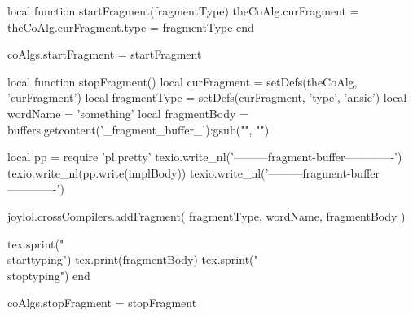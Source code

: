 \startLuaCode
local function startFragment(fragmentType)
  theCoAlg.curFragment      = { }
  theCoAlg.curFragment.type = fragmentType
end

coAlgs.startFragment = startFragment

local function stopFragment()
  local curFragment  = setDefs(theCoAlg, 'curFragment')
  local fragmentType = setDefs(curFragment, 'type', 'ansic')
  local wordName     = 'something'
  local fragmentBody = buffers.getcontent('_fragment_buffer_'):gsub("", "\n")

  local pp = require 'pl.pretty'
  texio.write_nl('---------fragment-buffer-------------')
  texio.write_nl(pp.write(implBody))
  texio.write_nl('---------fragment-buffer-------------')

  joylol.crossCompilers.addFragment(
    fragmentType,
    wordName,
    fragmentBody
  )

  tex.sprint("\\starttyping")
  tex.print(fragmentBody)
  tex.sprint("\\stoptyping")
end

coAlgs.stopFragment = stopFragment
\stopLuaCode
